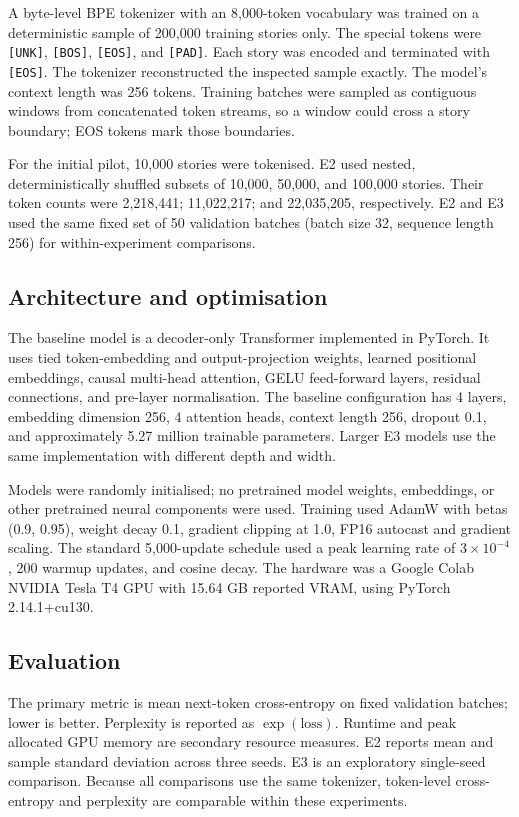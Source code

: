 \documentclass[10pt,a4paper]{article}
\begin{document}
A byte-level BPE tokenizer with an 8,000-token vocabulary was trained on a deterministic sample of 200,000 training stories only. The special tokens were \texttt{[UNK]}, \texttt{[BOS]}, \texttt{[EOS]}, and \texttt{[PAD]}. Each story was encoded and terminated with \texttt{[EOS]}. The tokenizer reconstructed the inspected sample exactly. The model's context length was 256 tokens. Training batches were sampled as contiguous windows from concatenated token streams, so a window could cross a story boundary; EOS tokens mark those boundaries.

For the initial pilot, 10,000 stories were tokenised. E2 used nested, deterministically shuffled subsets of 10,000, 50,000, and 100,000 stories. Their token counts were 2,218,441; 11,022,217; and 22,035,205, respectively. E2 and E3 used the same fixed set of 50 validation batches (batch size 32, sequence length 256) for within-experiment comparisons.

\subsection{Architecture and optimisation}
The baseline model is a decoder-only Transformer implemented in PyTorch. It uses tied token-embedding and output-projection weights, learned positional embeddings, causal multi-head attention, GELU feed-forward layers, residual connections, and pre-layer normalisation. The baseline configuration has 4 layers, embedding dimension 256, 4 attention heads, context length 256, dropout 0.1, and approximately 5.27 million trainable parameters. Larger E3 models use the same implementation with different depth and width.

Models were randomly initialised; no pretrained model weights, embeddings, or other pretrained neural components were used. Training used AdamW with betas (0.9, 0.95), weight decay 0.1, gradient clipping at 1.0, FP16 autocast and gradient scaling. The standard 5,000-update schedule used a peak learning rate of \(3\times10^{-4}\), 200 warmup updates, and cosine decay. The hardware was a Google Colab NVIDIA Tesla T4 GPU with 15.64 GB reported VRAM, using PyTorch 2.14.1+cu130.

\subsection{Evaluation}
The primary metric is mean next-token cross-entropy on fixed validation batches; lower is better. Perplexity is reported as \(\exp(\text{loss})\). Runtime and peak allocated GPU memory are secondary resource measures. E2 reports mean and sample standard deviation across three seeds. E3 is an exploratory single-seed comparison. Because all comparisons use the same tokenizer, token-level cross-entropy and perplexity are comparable within these experiments.
\end{document}
